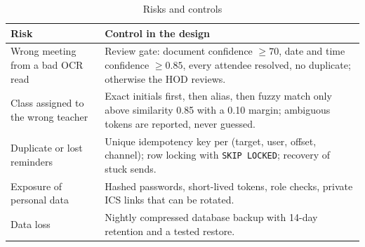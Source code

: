 {\small\begin{xltabular}{\textwidth}{|p{4.0cm}|Y|}
\caption{Risks and controls}\\
\hline
\textbf{Risk} & \textbf{Control in the design} \\ \hline
Wrong meeting from a bad OCR read & Review gate: document confidence $\ge 70$, date and time confidence $\ge 0.85$, every attendee resolved, no duplicate; otherwise the HOD reviews. \\ \hline
Class assigned to the wrong teacher & Exact initials first, then alias, then fuzzy match only above similarity 0.85 with a 0.10 margin; ambiguous tokens are reported, never guessed. \\ \hline
Duplicate or lost reminders & Unique idempotency key per (target, user, offset, channel); row locking with \texttt{SKIP LOCKED}; recovery of stuck sends. \\ \hline
Exposure of personal data & Hashed passwords, short-lived tokens, role checks, private ICS links that can be rotated. \\ \hline
Data loss & Nightly compressed database backup with 14-day retention and a tested restore. \\ \hline
\end{xltabular}}
